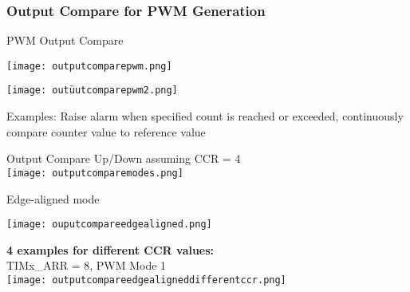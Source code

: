 \subsubsection{Output Compare for PWM Generation}


\begin{definition}{PWM Output Compare}

    \begin{center}
        \texttt{[image: outputcomparepwm.png]}
    \end{center}
    \begin{center}
    \texttt{[image: outüutcomparepwm2.png]}
    \end{center}
    
    \small Examples: Raise alarm when specified count is reached or exceeded, continuously compare counter value to reference value
\end{definition}

\begin{concept}{Output Compare Up/Down} assuming CCR = 4\\
    \texttt{[image: outputcomparemodes.png]}
\end{concept}

\begin{example2}{Edge-aligned mode}

    \begin{minipage}{0.5\linewidth}
    \texttt{[image: ouputcompareedgealigned.png]}
    \end{minipage}
    \begin{minipage}{0.5\linewidth}
    \textbf{4 examples for different CCR values:} \\ TIMx\_ARR = 8, PWM Mode 1\\
    \texttt{[image: outputcompareedgealigneddifferentccr.png]}
    \end{minipage}
\end{example2}







